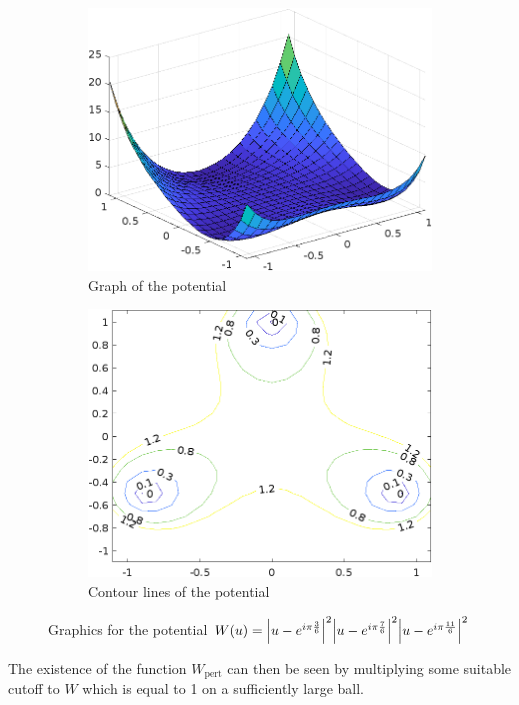 \begin{figure}[h]
	\centering
	
	\begin{subfigure}[b]{0.45\linewidth}
		
		\includegraphics[width=\textwidth]{trianglepotentialsurf}
		\caption{Graph of the potential}
	\end{subfigure}
	\hfill
	\begin{subfigure}[b]{0.45\linewidth}
		\includegraphics[width=\textwidth]{trianglecontour2d}
		
		\caption{Contour lines of the potential}
	\end{subfigure}
	
	\caption{Graphics for the potential
	$ W ( u ) = 
	\abs{ u  - e^{ i \pi\frac{ 3 }{ 6 }} }^{ 2 } 
	\abs{ u  - e^{ i \pi\frac{   7}{ 6  }} }^{ 2 }
	\abs{ u  - e^{ i \pi\frac{  11}{ 6  }} }^{ 2 }$ }
	\label{twodimensional_potential}
\end{figure} 
The existence of the function $ W_{ \mathrm{pert} } $ can then be seen by 
multiplying some suitable cutoff to $ W 
$ which is equal to 1 on a sufficiently large ball.

